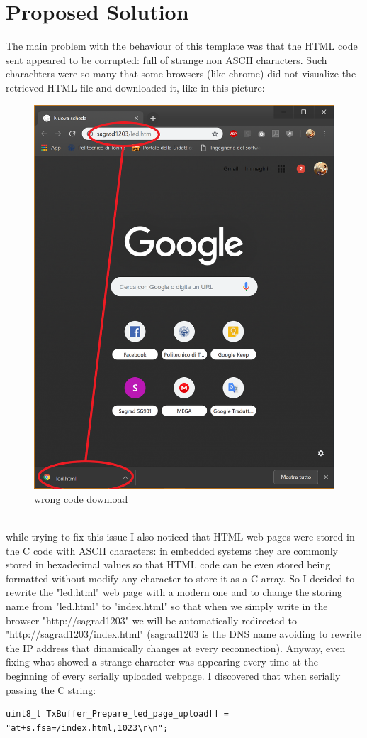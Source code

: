 \documentclass[peerreview]{IEEEtran}
\begin{document}
\section{Proposed Solution}
The main problem with the behaviour of this template was that the HTML code sent appeared to be corrupted: full of strange non ASCII characters. Such charachters were so many that some browsers (like chrome) did not visualize the retrieved HTML file and downloaded it, like in this picture:
\begin{figure}[!h]
\centering
\includegraphics[width=0.45\columnwidth]{7} 
\caption{wrong code download}
\label{fig_download}
\end{figure}
\\while trying to fix this issue I also noticed that HTML web pages were stored in the C code with ASCII characters: in embedded systems they are commonly stored in hexadecimal values so that HTML code can be even stored being formatted without modify any character to store it as a C array. So I decided to rewrite the "led.html" web page with a modern one and to change the storing name from "led.html" to "index.html" so that when we simply write in the browser "http://sagrad1203" we will be automatically redirected to "http://sagrad1203/index.html" (sagrad1203 is the DNS name avoiding to rewrite the IP address that dinamically changes at every reconnection). Anyway, even fixing what showed a strange character was appearing every time at the beginning of every serially uploaded webpage. I discovered that when serially passing the C string:
\begin{lstlisting}[style=CStyle]
uint8_t TxBuffer_Prepare_led_page_upload[] = "at+s.fsa=/index.html,1023\r\n";
\end{lstlisting}
\end{document}
